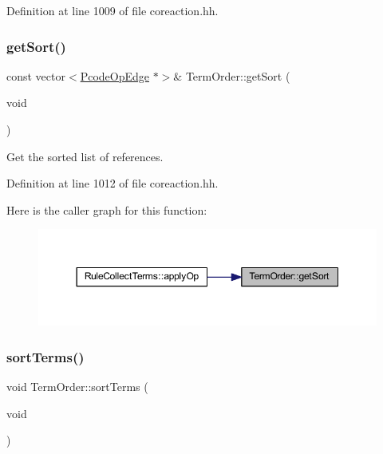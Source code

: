 Definition at line 1009 of file coreaction.\+hh.

\mbox{\label{class_term_order_a264c1976851310b98f7e65d4becbce56}} 
\subsubsection{\texorpdfstring{getSort()}{getSort()}}
{\footnotesize\ttfamily const vector$<$\mbox{\hyperlink{class_pcode_op_edge}{Pcode\+Op\+Edge}} $\ast$$>$\& Term\+Order\+::get\+Sort (\begin{DoxyParamCaption}\item[{void}]{ }\end{DoxyParamCaption})\hspace{0.3cm}{\ttfamily [inline]}}



Get the sorted list of references. 



Definition at line 1012 of file coreaction.\+hh.

Here is the caller graph for this function\+:
\nopagebreak
\begin{figure}[H]
\begin{center}
\leavevmode
\includegraphics[width=350pt]{class_term_order_a264c1976851310b98f7e65d4becbce56_icgraph}
\end{center}
\end{figure}
\mbox{\label{class_term_order_aa90a1457bc5dd8acd997cf59ff966893}} 
\subsubsection{\texorpdfstring{sortTerms()}{sortTerms()}}
{\footnotesize\ttfamily void Term\+Order\+::sort\+Terms (\begin{DoxyParamCaption}\item[{void}]{ }\end{DoxyParamCaption})}



